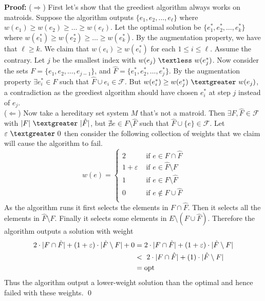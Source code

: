\documentclass{article}
\newcommand{\ep}{\varepsilon}
\newcommand{\lt}{\textless}
\newcommand{\gt}{\textgreater}
\newcommand{\imply}{\Rightarrow}
\newcommand{\limply}{\Leftarrow}
\newcommand{\x}{\cdot}
\newcommand{\proo}{\textbf{Proof: }}
\newcommand{\mcal}[1]{\mathcal{#1}}
\newcommand{\opt}{\text{opt}}
\newcommand{\sm}{\setminus}
\begin{document}
\proo ($\imply$) First let's show that the greediest algorithm always works on matroids. Suppose the algorithm outputs $\{e_1, e_2, \dots, e_{\ell}\}$ where $w(e_1) \geq w(e_2) \geq \dots \geq w(e_{\ell})$. Let the optimal solution be $\{e_1^*, e_2^*, \dots, e_k^*\}$ where $w(e_1^*) \geq w(e_2^*) \geq \dots \geq w(e_k^*)$. By the augmentation property, we have that $\ell \geq k$. We claim that $w(e_i) \geq w(e_i^*)$ for each $1 \leq i \leq \ell$. Assume the contrary. Let $j$ be the smallest index with $w(e_j)\ \lt\ w(e_j^*)$. Now consider the sets $F = \{e_1, e_2, \dots, e_{j-1}\}$, and $\hat{F} = \{e_1^*, e_2^*, \dots, e_j^*\}$. By the augmentation property $\exists e_i^* \in F$ such that $\hat{F} \cup e_i \in \mcal{F}$. But $w(e_i^*) \geq w(e_j^*)\ \gt\ w(e_j)$, a contradiction as the greediest algorithm should have chosen $e_i^*$ at step $j$ instead of $e_j$.\\
($\limply$) Now take a hereditary set system $M$ that's not a matroid. Then $\exists F, \hat{F} \in \mcal{F}$ with $|F|\ \gt\ |\hat{F}|$, but $\nexists e \in F \sm \hat{F}$ such that $\hat{F} \cup \{e\} \in \mcal{F}$. Let $\ep\ \gt\ 0$ then consider the following collection of weights that we claim will cause the algorithm to fail.
\[ w(e) =
\begin{cases}
	2 &\text{ if } e \in F \cap \hat{F}\\
	1 + \ep &\text{ if } e \in \hat{F} \sm F\\
	1 &\text{ if } e \in F \sm \hat{F}\\
	0 &\text{ if } e \notin F \cup \hat{F}\\
\end{cases}
\]
As the algorithm runs it first selects the elements in $F \cap \hat{F}$. Then it selects all the elements in $\hat{F} \sm F$. Finally it selects some elements in $E \sm (F\cup\hat{F})$. Therefore the algorithm outputs a solution with weight
\begin{align*}
2\x |F \cap \hat{F}| + (1 + \ep)\x|\hat{F}\sm F| + 0 &= 2\x |F \cap \hat{F}| + (1 + \ep)\x|\hat{F}\sm F|\\
	&\lt\ 2\x |F \cap \hat{F}| + (1)\x|\hat{F}\sm F|\\
	&= \opt
\end{align*}
Thus the algorithm output a lower-weight solution than the optimal and hence failed with these weights.
\qed 
\newpage

\end{document}
